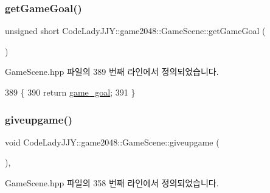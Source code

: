 \subsubsection{\texorpdfstring{get\+Game\+Goal()}{getGameGoal()}}
{\footnotesize\ttfamily unsigned short Code\+Lady\+J\+J\+Y\+::game2048\+::\+Game\+Scene\+::get\+Game\+Goal (\begin{DoxyParamCaption}{ }\end{DoxyParamCaption})\hspace{0.3cm}{\ttfamily [inline]}}



Game\+Scene.\+hpp 파일의 389 번째 라인에서 정의되었습니다.


\begin{DoxyCode}
389                                 \{
390         \textcolor{keywordflow}{return} \hyperlink{class_code_lady_j_j_y_1_1game2048_1_1_game_scene_a32978808e5a60713a1d8bf085c2d3e11}{game\_goal};
391     \}
\end{DoxyCode}
\mbox{\label{class_code_lady_j_j_y_1_1game2048_1_1_game_scene_a555636f47220602c6b2b25f6594b9dd0}} 
\subsubsection{\texorpdfstring{giveupgame()}{giveupgame()}}
{\footnotesize\ttfamily void Code\+Lady\+J\+J\+Y\+::game2048\+::\+Game\+Scene\+::giveupgame (\begin{DoxyParamCaption}{ }\end{DoxyParamCaption})\hspace{0.3cm}{\ttfamily [inline]}, {\ttfamily [private]}}



Game\+Scene.\+hpp 파일의 358 번째 라인에서 정의되었습니다.


